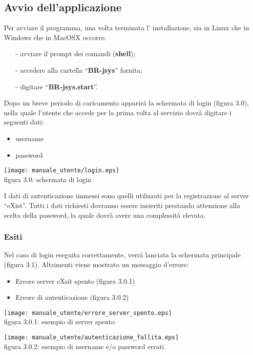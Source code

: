 \subsection{Avvio dell'applicazione}
Per avviare il programma, una volta terminata l' installazione, sia in Linux che in Windows che in MacOSX occorre:
\begin{itemize}
\item[-] avviare il prompt dei comandi (\textbf{shell});
\item[-] accedere alla cartella ``\textbf{BR-jsys}'' fornita; 
\item[-] digitare ``\textbf{BR-jsys.start}''.
\end{itemize}
 Dopo un breve periodo di caricamento apparir\`a la schermata di login (figura 3.0), nella quale l'utente che accede per la prima volta al servizio dovr\`a digitare i seguenti dati: 
\begin{itemize}
\item username
\item password
\end{itemize}
\begin{center}
\texttt{[image: manuale\_utente/login.eps]}\\
 figura 3.0: schermata di login
\end{center}
I dati di autenticazione immessi sono quelli utilizzati per la registrazione al server ``eXist''. Tutti i dati richiesti dovranno essere insieriti prestando attenzione alla scelta della password, la quale dovr\`a avere una complessit\`a elevata. 
\subsubsection{Esiti}
Nel caso di login eseguita correttamente, verr\`a lanciata la schermata principale (figura 3.1).
Altrimenti viene mostrato un messaggio d'errore:
\begin{itemize}
\item Errore server eXsit spento (figura 3.0.1)
\item Errore di autenticazione (figura 3.0.2)
\end{itemize}
\begin{center}
\texttt{[image: manuale\_utente/errore\_server\_spento.eps]}\\
 figura 3.0.1: esempio di server spento
\end{center} 

\begin{center}
\texttt{[image: manuale\_utente/autenticazione\_fallita.eps]}\\
figura 3.0.2: esempio di username e/o password errati
\end{center} 

